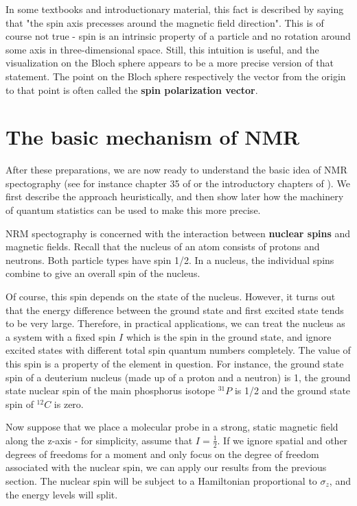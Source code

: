 \documentclass[a4paper, draft]{article}
\theoremstyle{own}
\theoremstyle{remark}
\begin{document}
In some textbooks and introductionary material, this fact is described by saying that "the spin axis precesses around the magnetic field direction". This is of course not true - spin is an intrinsic property of a particle and no rotation around some axis in three-dimensional space. Still, this intuition is useful, and the visualization on the Bloch sphere appears to be a more precise version of that statement. The point on the Bloch sphere respectively the vector from the origin to that point is often called the {\bf spin polarization vector}.

\section{The basic mechanism of NMR}

After these preparations, we are now ready to understand the basic idea of NMR spectography (see for instance chapter 35 of  \cite{FeynmanII} or the introductory chapters of \cite{Levitt}). We first describe the approach heuristically, and then show later how the machinery of quantum statistics can be used to make this more precise.

NRM spectography is concerned with the interaction between {\bf nuclear spins} and magnetic fields. Recall that the nucleus of an atom consists of protons and neutrons. Both particle types have spin 1/2. In a nucleus, the individual spins combine to give an overall spin of the nucleus.

Of course, this spin depends on the state of the nucleus. However, it turns out that the energy difference between the ground state and first excited state tends to be very large. Therefore, in practical applications, we can treat the nucleus as a system with a fixed spin $I$ which is the spin in the ground state, and ignore excited states with different total spin quantum numbers completely. The value of this spin is a property of the element in question. For instance, the ground state spin of a deuterium nucleus (made up of a proton and a neutron) is 1, the ground state nuclear spin of the main phosphorus isotope ${}^{31}P$ is 1/2 and the ground state spin of ${}^{12}C$ is zero. 

Now suppose that we place a molecular probe in a strong, static magnetic field along the z-axis - for simplicity, assume that $I = \frac{1}{2}$. If we ignore spatial and other degrees of freedoms for a moment and only focus on the degree of freedom associated with the nuclear spin, we can apply our results from the previous section. The nuclear spin will be subject to a Hamiltonian proportional to $\sigma_z$, and the energy levels will split. 
\end{document}

